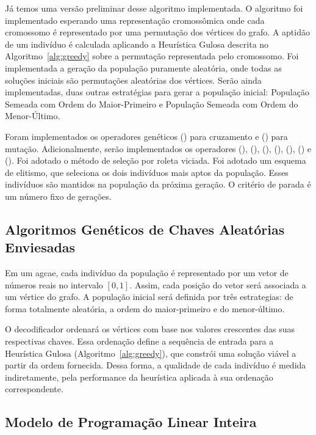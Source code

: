 Já temos uma versão preliminar desse algoritmo implementada. O algoritmo foi implementado esperando uma representação cromossômica onde cada cromossomo é representado por uma permutação dos vértices do grafo. A aptidão de um indivíduo é calculada aplicando a Heurística Gulosa descrita no Algoritmo~\ref{alg:greedy} sobre a permutação representada pelo cromossomo. Foi implementada a geração da população puramente aleatória, onde todas as soluções iniciais são permutações aleatórias dos vértices. Serão ainda implementadas, duas outras estratégias para gerar a população inicial: População Semeada com Ordem do Maior-Primeiro e População Semeada com Ordem do Menor-Último. 

Foram implementados os operadores genéticos  () para cruzamento e  () para mutação. Adicionalmente, serão implementados os operadores 
 (), 
 (), 
 (), 
 (), 
 (), 
 () e 
 (). Foi adotado o método de seleção por roleta viciada. Foi adotado um esquema de elitismo, que seleciona os dois indivíduos mais aptos da população. Esses indivíduos são mantidos na população da próxima geração. O critério de parada é um número fixo de gerações.

\subsection{Algoritmos Genéticos de Chaves Aleatórias Enviesadas}

Em um \gls{agcae}, cada indivíduo da população é representado por um vetor de números reais no intervalo $[0, 1]$. Assim, cada posição do vetor será associada a um vértice do grafo. A população inicial será definida por três estrategias: de forma totalmente aleatória, a ordem do maior-primeiro e do menor-último.

O decodificador ordenará os vértices com base nos valores crescentes das suas respectivas chaves. Essa ordenação define a sequência de entrada para a Heurística Gulosa (Algoritmo~\ref{alg:greedy}), que constrói uma solução viável a partir da ordem fornecida. Dessa forma, a qualidade de cada indivíduo é medida indiretamente, pela performance da heurística aplicada à sua ordenação correspondente.

\subsection{Modelo de Programação Linear Inteira}

